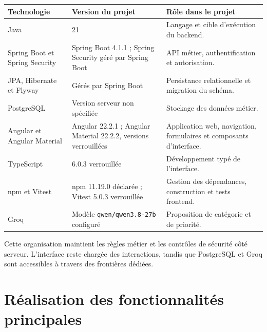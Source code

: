 \noindent
\begin{minipage}{\textwidth}
\captionsetup{type=table,aboveskip=0pt,belowskip=6pt}
\centering
\small
\caption{Technologies et versions du projet}
\label{tab:03-technologies}
\begingroup
\setlength{\tabcolsep}{4pt}
\setlength{\arrayrulewidth}{0.3pt}
\renewcommand{\arraystretch}{1.08}
\newcommand{\TCell}[1]{{\raggedright #1\par}}
\begin{tabular}{@{}p{}p{}p{}@{}}
\hline
\TCell{\textbf{Technologie}} & \TCell{\textbf{Version du projet}} & \TCell{\textbf{Rôle dans le projet}}\\ \hline
\TCell{Java} & \TCell{21} & \TCell{Langage et cible d'exécution du backend.}\\ \hline
\TCell{Spring Boot et Spring Security} & \TCell{Spring Boot 4.1.1 ; Spring Security géré par Spring Boot} & \TCell{API métier, authentification et autorisation.}\\ \hline
\TCell{JPA, Hibernate et Flyway} & \TCell{Gérés par Spring Boot} & \TCell{Persistance relationnelle et migration du schéma.}\\ \hline
\TCell{PostgreSQL} & \TCell{Version serveur non spécifiée} & \TCell{Stockage des données métier.}\\ \hline
\TCell{Angular et Angular Material} & \TCell{Angular 22.2.1 ; Angular Material 22.2.2, versions verrouillées} & \TCell{Application web, navigation, formulaires et composants d'interface.}\\ \hline
\TCell{TypeScript} & \TCell{6.0.3 verrouillée} & \TCell{Développement typé de l'interface.}\\ \hline
\TCell{npm et Vitest} & \TCell{npm 11.19.0 déclarée ; Vitest 5.0.3 verrouillée} & \TCell{Gestion des dépendances, construction et tests frontend.}\\ \hline
\TCell{Groq} & \TCell{Modèle \texttt{qwen/qwen3.8-27b} configuré} & \TCell{Proposition de catégorie et de priorité.}\\ \hline
\end{tabular}
\endgroup
\end{minipage}

Cette organisation maintient les règles métier et les contrôles de sécurité côté serveur. L'interface reste chargée des interactions, tandis que PostgreSQL et Groq sont accessibles à travers des frontières dédiées.

\section{Réalisation des fonctionnalités principales}
\label{sec:03-parcours-demande}

